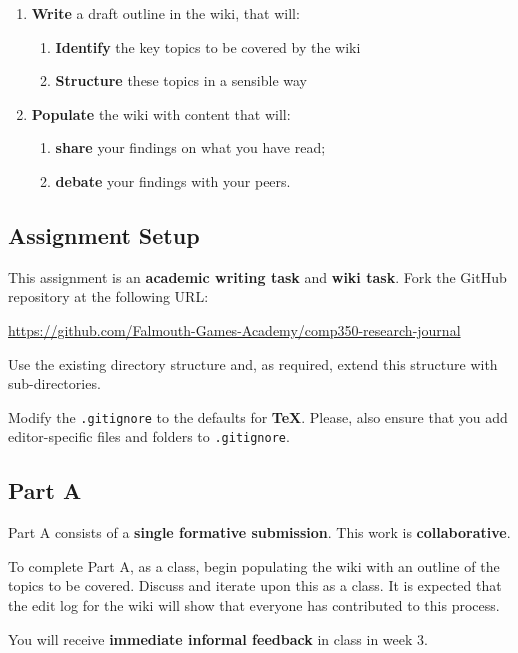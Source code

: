 \documentclass{../../fal_assignment}
\begin{document}
	\begin{enumerate}[label=(\Alph*)]
		\item \textbf{Write} a draft outline in the wiki, that will:
		\begin{enumerate}[label=(\roman*)]
			\item \textbf{Identify} the key topics to be covered by the wiki
			\item \textbf{Structure} these topics in a sensible way
		\end{enumerate}
		\item \textbf{Populate} the wiki with content that will:
    	\begin{enumerate}[label=(\roman*)]
			\item \textbf{share} your findings on what you have read;
			\item \textbf{debate} your findings with your peers.
		\end{enumerate}
	\end{enumerate}

\subsection*{Assignment Setup}

This assignment is an \textbf{academic writing task} and \textbf{wiki task}. Fork the GitHub repository at the following URL:

\indent \url{https://github.com/Falmouth-Games-Academy/comp350-research-journal}

Use the existing directory structure and, as required, extend this structure with sub-directories.

Modify the \texttt{.gitignore} to the defaults for \textbf{TeX}. Please, also ensure that you add editor-specific files and folders to \texttt{.gitignore}. 

\subsection*{Part A}

Part A consists of a \textbf{single formative submission}. This work is \textbf{collaborative}.

To complete Part A, as a class, begin populating the wiki with an outline of the topics to be covered.
Discuss and iterate upon this as a class.
It is expected that the edit log for the wiki will show that everyone has contributed to this process.

You will receive \textbf{immediate informal feedback} in class in week 3.
\end{document}
